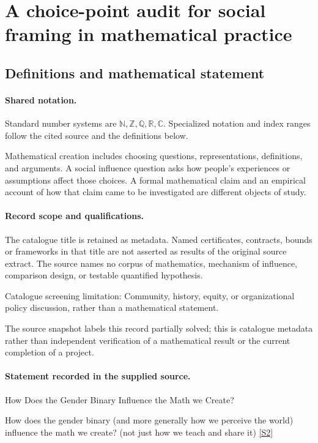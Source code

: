 \documentclass[11pt]{article}
\newcommand{\sref}[2]{\hyperlink{source:#1:#2}{[S#2]}}
\begin{document}
\section{A choice-point audit for social framing in mathematical practice}\label{statement}

\subsection{Definitions and mathematical statement}

\paragraph{Shared notation.}Standard number systems are $\mathbb N,\mathbb Z,\mathbb Q,\mathbb R,\mathbb C$. Specialized notation and index ranges follow the cited source and the definitions below.


Mathematical creation includes choosing questions, representations, definitions, and arguments. A social influence question asks how people's experiences or assumptions affect those choices. A formal mathematical claim and an empirical account of how that claim came to be investigated are different objects of study.
\paragraph{Record scope and qualifications.}
The catalogue title is retained as metadata. Named certificates, contracts, bounds or frameworks in that title are not asserted as results of the original source extract.
The source names no corpus of mathematics, mechanism of influence, comparison design, or testable quantified hypothesis.

Catalogue screening limitation: Community, history, equity, or organizational policy discussion, rather than a mathematical statement.

The source snapshot labels this record partially solved; this is catalogue metadata rather than independent verification of a mathematical result or the current completion of a project.
\paragraph{Statement recorded in the supplied source.}
How Does the Gender Binary Influence the Math we Create?

How does the gender binary (and more generally how we perceive the world) influence the math we create? (not just how we teach and share it) \sref{statement}{2}
\end{document}
